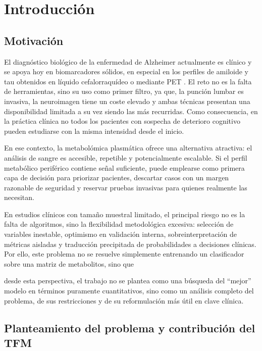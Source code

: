 \chapter{Introducción}\label{chap:introduccion}

\section{Motivación}

El diagnóstico biológico de la enfermedad de Alzheimer actualmente es clínico y se apoya hoy en biomarcadores sólidos, en especial en los perfiles de amiloide y tau obtenidos en líquido cefalorraquídeo o mediante PET \parencite{jack2018nia}. El reto no es la falta de herramientas, sino su uso como primer filtro, ya que, la punción lumbar es invasiva, la neuroimagen tiene un coste elevado y ambas técnicas presentan una disponibilidad limitada a su vez siendo las más recurridas. Como consecuencia, en la práctica clínica no todos los pacientes con sospecha de deterioro cognitivo pueden estudiarse con la misma intensidad desde el inicio.

En ese contexto, la metabolómica plasmática ofrece una alternativa atractiva: el análisis de sangre es accesible, repetible y potencialmente escalable. Si el perfil metabólico periférico contiene señal suficiente, puede emplearse como primera capa de decisión para priorizar pacientes, descartar casos con un margen razonable de seguridad y reservar pruebas invasivas para quienes realmente las necesitan.

En estudios clínicos con tamaño muestral limitado, el principal riesgo no es la falta de algoritmos, sino la flexibilidad metodológica excesiva: selección de variables inestable, optimismo en validación interna, sobreinterpretación de métricas aisladas y traducción precipitada de probabilidades a decisiones clínicas. Por ello, este problema no se resuelve simplemente entrenando un clasificador sobre una matriz de metabolitos, sino que

desde esta perspectiva, el trabajo no se plantea como una búsqueda del ``mejor'' modelo en términos puramente cuantitativos, sino como un análisis completo del problema, de sus restricciones y de su reformulación más útil en clave clínica.

\section{Planteamiento del problema y contribución del TFM}


